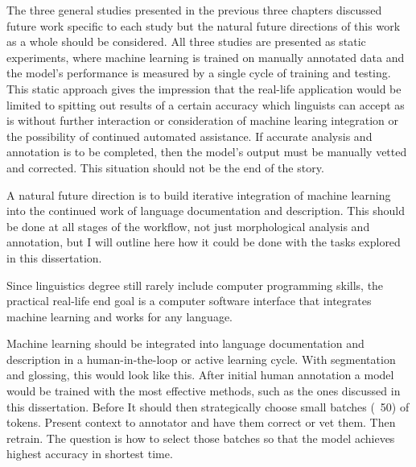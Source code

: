 
The three general studies presented in the previous three chapters discussed future work specific to each study but the natural future directions of this work as a whole should be considered. All three studies are presented as static experiments, where machine learning is trained on manually annotated data and the model's performance is measured by a single cycle of training and testing. This static approach gives the impression that the real-life application would be limited to spitting out results of a certain accuracy which linguists can accept as is without further interaction or consideration of machine learing integration or the possibility of continued automated assistance. If accurate analysis and annotation is to be completed, then the model's output must be manually vetted and corrected. This situation should not be the end of the story. 

A natural future direction is to build iterative integration of machine learning into the continued work of language documentation and description. This should be done at all stages of the workflow, not just morphological analysis and annotation, but I will outline here how it could be done with the tasks explored in this dissertation. 

Since linguistics degree still rarely include computer programming skills, the practical real-life end goal is a computer software interface that integrates machine learning and works for any language. 

Machine learning should be integrated into language documentation and description in a human-in-the-loop or active learning cycle. With segmentation and glossing, this would look like this. After initial human annotation a model would be trained with the most effective methods, such as the ones discussed in this dissertation. Before It should then strategically choose small batches (~50) of tokens. Present context to annotator and have them correct or vet them. Then retrain. The question is how to select those batches so that the model achieves highest accuracy in shortest time. 

